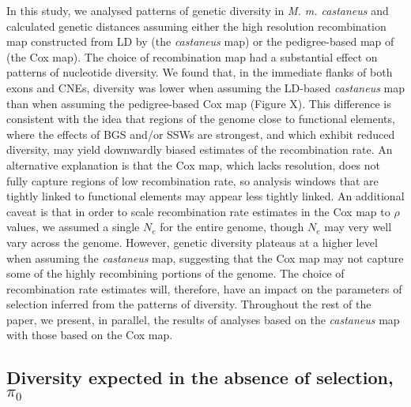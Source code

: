 \documentclass[11pt]{article}
\begin{document}
	In this study, we analysed patterns of genetic diversity in \textit{M. m. castaneus} and calculated genetic distances assuming either the high resolution recombination map constructed from LD by \cite{RN340}(the \textit{castaneus} map) or the pedigree-based map of \cite{RN232} (the Cox map). The choice of recombination map had a substantial effect on patterns of nucleotide diversity. We found that, in the immediate flanks of both exons and CNEs, diversity was lower when assuming the LD-based \textit{castaneus} map than when assuming the pedigree-based Cox map (Figure X). This difference is consistent with the idea that regions of the genome close to functional elements, where the effects of BGS and/or SSWs are strongest, and which exhibit reduced diversity, may yield downwardly biased estimates of the recombination rate. An alternative explanation is that the Cox map, which lacks resolution, does not fully capture regions of low recombination rate, so analysis windows that are tightly linked to functional elements may appear less tightly linked. An additional caveat is that in order to scale  recombination rate estimates in the Cox map to $\rho$ values, we assumed a single $N_e$ for the entire genome, though $N_e$ may very well vary across the genome. However, genetic diversity  plateaus at a higher level when assuming the \textit{castaneus} map, suggesting that the Cox map may not capture some of the highly recombining portions of the genome. The choice of recombination rate estimates will, therefore, have an impact on the parameters of selection inferred from the patterns of diversity. Throughout the rest of the paper, we present, in parallel, the results of analyses based on the \textit{castaneus} map with those based on the Cox map.

	\subsection*{Diversity expected in the absence of selection, $\pi_0$}
\end{document}
